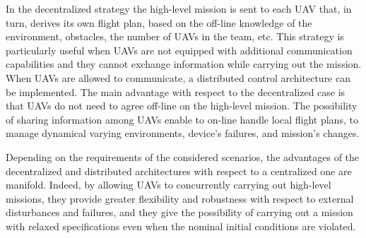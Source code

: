 \documentclass[letterpaper, 10 pt, conference]{ieeeconf}
\begin{document}
%
In the decentralized strategy the high-level mission is sent to each UAV that, in turn, derives its own flight plan, based on the off-line knowledge of the environment, obstacles, the number of UAVs in the team, etc. This strategy is particularly useful when UAVs are not equipped with additional communication capabilities and they cannot exchange information while carrying out the mission. 
%
When UAVs are allowed to communicate, a distributed control architecture can be implemented. The main advantage with respect to the decentralized case is that UAVs do not need to agree off-line on the high-level mission. The possibility of sharing information among UAVs enable to on-line handle local flight plans, to manage dynamical varying environments, device's failures, and mission's changes. 

Depending on the requirements of the considered scenarios, the advantages of the decentralized and distributed architectures with respect to a centralized one are manifold. Indeed, by allowing UAVs to concurrently carrying out high-level missions, they provide greater flexibility and robustness with respect to external disturbances and failures, and they give the possibility of carrying out a mission with relaxed specifications even when the nominal initial conditions are violated.
\end{document}

